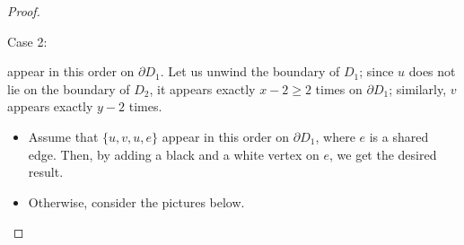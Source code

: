 \begin{proof}
\begin{sideline}{Case 2:}
\begin{center}
\end{center}
appear in this order on $\partial D_1$. Let us unwind the boundary of $D_1$; since $u$ does not lie on the boundary of $D_2$, it appears exactly $x-2\ge 2$ times on $\partial D_1$; similarly, $v$ appears exactly $y-2$ times.
\begin{itemize}
\def\myradius{1.3cm}
\item Assume that $\{u,v,u,e\}$ appear in this order on $\partial D_1$, where $e$ is a shared edge. Then, by adding a black and a white vertex on $e$, we get the desired result.
\begin{center}
\def\picturesetupbase{
\begin{pgfonlayer}{graph edge below}
\fill[disk 1,postaction={draw,surf boundary}] circle(1);
\end{pgfonlayer}
}
\def\picturesetup{
\picturesetupbase
\path (0:1) pic{black vertex} node[right] {$u$};
\path (180:1) pic {black vertex} node[left] {$u$};
\path (-90:1) pic {white vertex} node[below] {$v$};
\path[graph edge={below}{green edge}] (45:1) arc (45:135:1);
}
\end{center}
\item Otherwise, consider the pictures below.
\begin{enumarabic}

\end{enumarabic}
\end{itemize}
\end{sideline}
\end{proof}
